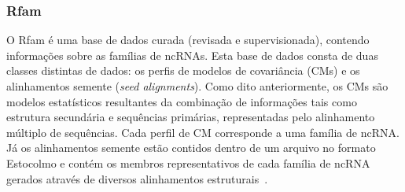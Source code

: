 








\subsubsection*{Rfam}

O Rfam é uma base de dados curada (revisada e supervisionada), contendo informações sobre as famílias de ncRNAs. Esta base de dados consta de duas classes distintas de dados: os perfis de modelos de covariância (CMs) e os alinhamentos semente (\textit{seed alignments}). Como dito anteriormente, os CMs são modelos estatísticos resultantes da combinação de informações tais como estrutura secundária e sequências primárias, representadas pelo alinhamento múltiplo de sequências. Cada perfil de CM corresponde a uma família de ncRNA. Já os alinhamentos semente  estão contidos dentro de um arquivo no formato Estocolmo e contém os membros representativos de cada família de ncRNA gerados através de diversos alinhamentos estruturais~\citep{griffiths2003rfam:2003}.


